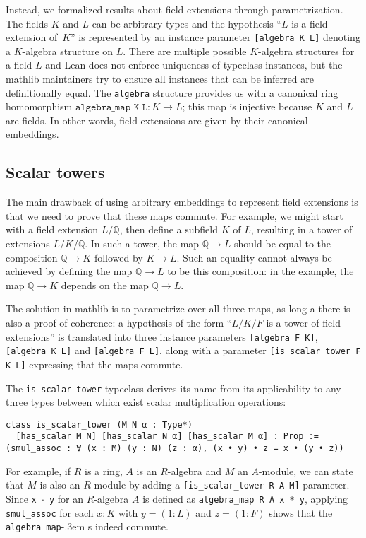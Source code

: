 \documentclass[a4paper,USenglish,cleveref, autoref, thm-restate]{lipics-v2021}
\newcommand{\lean}[1]{\texttt{#1}\xspace}
\newcommand{\mathlib}{\textsf{mathlib}\xspace}
\newcommand{\Q}{\mathbb{Q}}
\begin{document}
Instead, we formalized results about field extensions through parametrization. The fields $K$ and $L$ can be arbitrary types
and the hypothesis ``$L$ is a field extension of~$K$'' is represented by an instance parameter \lean{[algebra K L]} denoting a $K$-algebra structure on $L$.
There are multiple possible $K$-algebra structures for a field $L$ and Lean does not enforce uniqueness of typeclass instances,
but the \mathlib maintainers try to ensure all instances that can be inferred are definitionally equal.
The \lean{algebra} structure provides us with a canonical ring homomorphism $\lean{algebra\_map K L} : K \to L$; this map is injective because $K$ and $L$ are fields.
In other words, field extensions are given by their canonical embeddings.

\subsection{Scalar towers} \label{sec:scalar_tower}

The main drawback of using arbitrary embeddings to represent field extensions is that we need to prove that these maps commute.
For example, we might start with a field extension $L / \Q$, then define a subfield $K$ of $L$,
resulting in a tower of extensions $L / K / \Q$.
In such a tower, the map $\Q \to L$ should be equal to the composition $\Q \to K$ followed by $K \to L$.
Such an equality cannot always be achieved by defining the map $\Q \to L$ to be this composition: in the example, the map $\Q \to K$ depends on the map $\Q \to L$.

The solution in \mathlib is to parametrize over all three maps, as long a there is also a proof of coherence:
a hypothesis of the form ``$L / K / F$ is a tower of field extensions'' is translated into three instance parameters \lean{[algebra F K]}, \lean{[algebra K L]} and \lean{[algebra F L]},
along with a parameter \lean{[is\_scalar\_tower F K L]} expressing that the maps commute.

The \lean{is\_scalar\_tower} typeclass derives its name from its applicability to any three types between which exist scalar multiplication operations:
\begin{lstlisting}
class is_scalar_tower (M N α : Type*)
  [has_scalar M N] [has_scalar N α] [has_scalar M α] : Prop :=
(smul_assoc : ∀ (x : M) (y : N) (z : α), (x • y) • z = x • (y • z))
\end{lstlisting}
For example, if $R$ is a ring, $A$ is an $R$-algebra and $M$ an $A$-module, we can state that $M$ is also an $R$-module by adding a \lean{[is\_scalar\_tower R A M]} parameter.
Since \lean{x~$\cdot$~y} for an $R$-algebra $A$ is defined as \lean{algebra\_map R A x * y}, applying \lean{smul\_assoc} for each $x : K$ with $y = (1 : L)$ and $z = (1 : F)$ shows that the \lean{algebra\_map}\kern-.3em s indeed commute.
\end{document}
